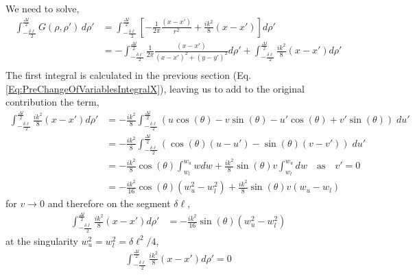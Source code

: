 \documentclass{article}
\newcommand{\0}{\varnothing}
\begin{document}
We need to solve,
\begin{align*}
    \int_{-\frac{\delta \ell}{2}}^{\frac{\Delta l}{2}} G(\rho,\rho')\, d\rho' &= 
    \int_{-\frac{\delta \ell}{2}}^{\frac{\Delta l}{2}} \left[ -\frac{1}{2 \pi } \frac{(x-x')}{r^2} + \frac{ik^2}{8}(x-x') \right] d\rho'\\
    &=   -\int_{-\frac{\delta \ell}{2}}^{\frac{\Delta l}{2}} \frac{1}{2 \pi } \frac{(x-x')}{(x-x')^2+(y-y')^2} d\rho' + \int_{-\frac{\delta \ell}{2}}^{\frac{\Delta l}{2}} \frac{ik^2}{8}(x-x')  d\rho'\\
\end{align*}
The first integral is calculated in the previous section (Eq. \eqref{Eq:PreChangeOfVariablesIntegralX}), leaving us to add to the original contribution the term,
\begin{align*}
    \int_{-\frac{\delta \ell}{2}}^{\frac{\Delta l}{2}} \frac{ik^2}{8}(x-x')  d\rho' 
    &= -\frac{ik^2}{8} \int_{-\frac{\delta \ell}{2}}^{\frac{\Delta l}{2}} \left( u\cos(\theta) - v\sin(\theta) 
                                  - u'\cos(\theta) + v'\sin(\theta) \right) \; du'\\
    &= -\frac{ik^2}{8} \int_{-\frac{\delta \ell}{2}}^{\frac{\Delta l}{2}} \left( \cos(\theta)(u-u') - \sin(\theta)(v-v') \right) \; du'\\    
    &= -\frac{ik^2}{8} \cos(\theta)\int_{w_l}^{w_u}  w dw + \frac{ik^2}{8} \sin(\theta)v \int_{w_l}^{w_u} dw \quad \text{as} \quad v' = 0 \\
    &= -\frac{ik^2}{16} \cos(\theta) \left( w_u^2 - w^2_l \right) + \frac{ik^2}{8} \sin(\theta)v (w_u-w_l)
\end{align*}
for $v \rightarrow 0$ and therefore on the segment $\delta \ell$,
\begin{align*}
    \int_{-\frac{\delta \ell}{2}}^{\frac{\Delta l}{2}} \frac{ik^2}{8}(x-x')  d\rho'  &= -\frac{ik^2}{16} \sin(\theta) \left( w_u^2 - w^2_l \right)
\end{align*}
at the singularity $w^2_u = w^2_l = \delta \ell^2/4$,
\begin{align*}
    \int_{-\frac{\delta \ell}{2}}^{\frac{\Delta l}{2}} \frac{ik^2}{8}(x-x')  d\rho' = 0
\end{align*}
\end{document}
